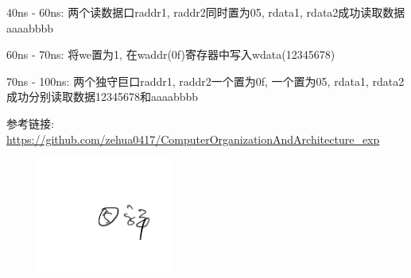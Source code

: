\documentclass[AutoFakeBold]{LZUThesis}
\begin{document}
40ns - 60ns: 两个读数据口raddr1, raddr2同时置为05, rdata1, rdata2成功读取数据aaaabbbb

60ns - 70ns: 将we置为1, 在waddr(0f)寄存器中写入wdata(12345678)

70ns - 100ns: 两个独守巨口raddr1, raddr2一个置为0f, 一个置为05, rdata1, rdata2成功分别读取数据12345678和aaaabbbb

\backmatter





\Appendix
参考链接:
\url{https://github.com/zehua0417/ComputerOrganizationAndArchitecture_exp}
\begin{figure}[htbp]
    \centering
    \includegraphics[width=0.4\textwidth]{img/sign}
\end{figure}



\end{document}
